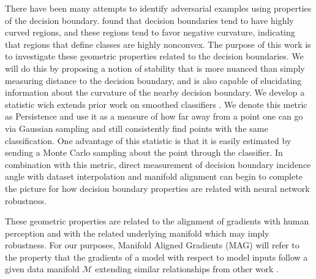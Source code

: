 
There have been many attempts to identify adversarial examples using properties of the decision boundary. \citet{Fawzi2018empirical} found that decision boundaries tend to have highly curved regions, and these regions tend to favor negative curvature, indicating that regions that define classes are highly nonconvex. The purpose of this work is to investigate these geometric properties related to the decision boundaries. We will do this by proposing a notion of stability that is more nuanced than simply measuring distance to the decision boundary, and is also capable of elucidating information about the curvature of the nearby decision boundary. We develop a statistic wich extends prior work on smoothed classifiers \cite{cohen2019certified}. We denote this metric as Persistence and use it as a measure of how far away from a point one can go via Gaussian sampling and still consistently find points with the same classification. One advantage of this statistic is that it is easily estimated by sending a Monte Carlo sampling about the point through the classifier. In combination with this metric, direct measurement of decision boundary incidence angle with dataset interpolation and manifold alignment can begin to complete the picture for how decision boundary properties are related with neural network robustness. 


 These geometric properties are related to the alignment of gradients with human perception \cite{ganz2022perceptually, kaur2019perceptually, shah2021input} and with the related underlying manifold \cite{kaur2019perceptually, ilyas2019adversarial} which may imply robustness. For our purposes, Manifold Aligned Gradients (MAG) will refer to the property that the gradients of a model with respect to model inputs follow a given data manifold $\mathcal{M}$ extending similar relationships from other work \cite{shamir2021dimpled}. 

